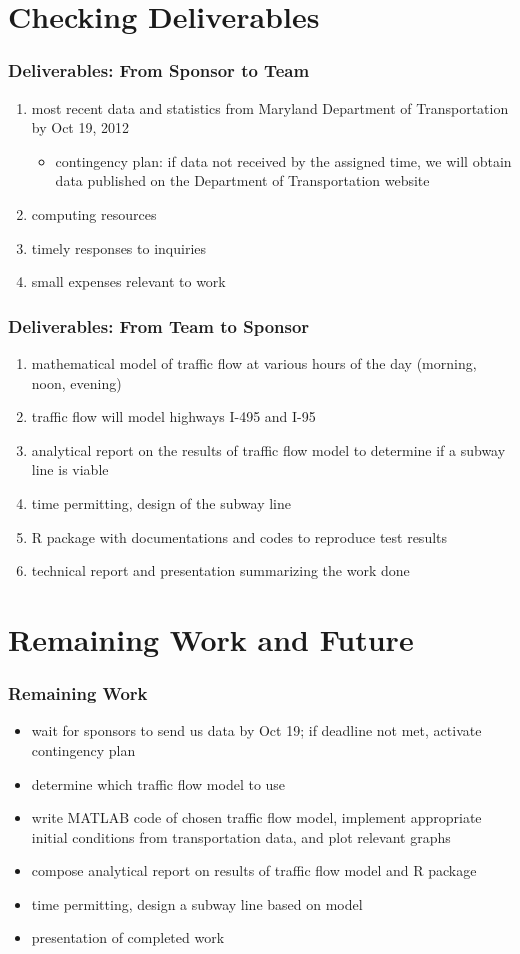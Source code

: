 \documentclass[compress,handout,10pt]{beamer}
\let\olditem\item
\renewcommand{\item}{\setlength{\itemsep}{0.5\baselineskip}\olditem}
\begin{document}
\section{Checking Deliverables}
\begin{frame}
    \frametitle{Deliverables: From Sponsor to Team}
    \begin{enumerate}
        \item most recent data and statistics from Maryland Department of Transportation by Oct 19, 2012
	\begin{itemize}
		\item contingency plan: if data not received by the assigned time, we will obtain data published on the Department of Transportation website
	\end{itemize}
	\item computing resources
	\item timely responses to inquiries
	\item small expenses relevant to work
    \end{enumerate}
\end{frame}

\begin{frame}
    \frametitle{Deliverables: From Team to Sponsor}
    \begin{enumerate}
        \item mathematical model of traffic flow at various hours of the day (morning, noon, evening)
	\item traffic flow will model highways I-495 and I-95
	\item analytical report on the results of traffic flow model to determine if a subway line is viable
	\item time permitting, design of the subway line
	\item R package with documentations and codes to reproduce test results
	\item technical report and presentation summarizing the work done
    \end{enumerate}
\end{frame}

\section{Remaining Work and Future}
\begin{frame}
    \frametitle{Remaining Work}
	\begin{itemize}
	\item wait for sponsors to send us data by Oct 19; if deadline not met, activate contingency plan
	\item determine which traffic flow model to use
	\item write MATLAB code of chosen traffic flow model, implement appropriate initial conditions from transportation data, and plot relevant graphs
	\item compose analytical report on results of traffic flow model and R package
	\item time permitting, design a subway line based on model
	\item presentation of completed work
	\end{itemize}
\end{frame}
\end{document}
